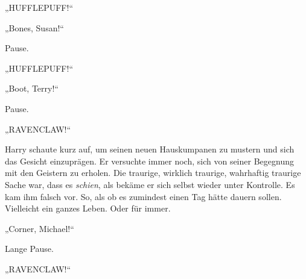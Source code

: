 

„HUFFLEPUFF!“

„Bones, Susan!“

Pause.

„HUFFLEPUFF!“

„Boot, Terry!“

Pause.

„RAVENCLAW!“

Harry schaute kurz auf, um seinen neuen Hauskumpanen zu mustern und sich das Gesicht einzuprägen. Er versuchte immer noch, sich von seiner Begegnung mit den Geistern zu erholen. Die traurige, wirklich traurige, wahrhaftig traurige Sache war, dass es \emph{schien}, als bekäme er sich selbst wieder unter Kontrolle. Es kam ihm falsch vor. So, als ob es zumindest einen Tag hätte dauern sollen. Vielleicht ein ganzes Leben. Oder für immer.




„Corner, Michael!“

Lange Pause.

„RAVENCLAW!“

